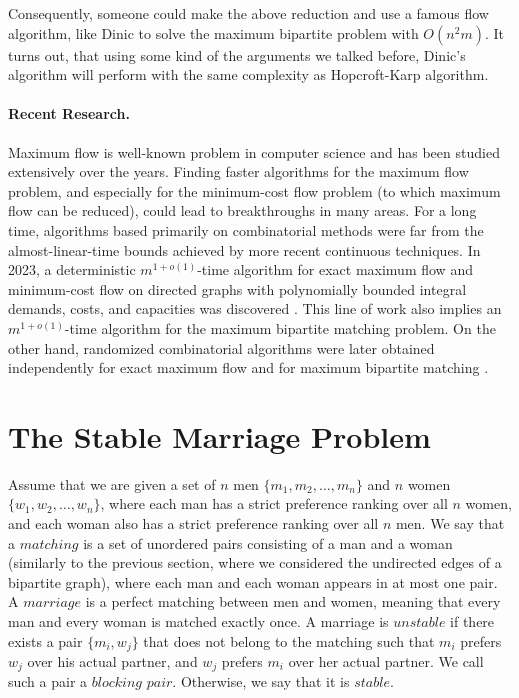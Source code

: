\documentclass[12pt]{report}
\numberwithin{algorithm}{chapter}
\begin{document}
	Consequently, someone could make the above reduction and use a famous flow algorithm, like Dinic \cite{dinitz1970} to solve the maximum bipartite problem with $O(n^{2}m)$. It turns out, that using some kind of the arguments we talked before, Dinic's algorithm will perform with the same complexity as Hopcroft-Karp algorithm.

	\paragraph{Recent Research.} Maximum flow is well-known problem in computer science and has been studied extensively over the years. Finding faster algorithms for the maximum flow problem, and  especially for the minimum-cost flow problem (to which maximum flow can be reduced), could lead to breakthroughs in many areas. For a long time, algorithms based primarily on combinatorial methods were far from the almost-linear-time bounds achieved by more recent continuous techniques. In 2023, a deterministic $m^{1+o(1)}$-time algorithm for exact maximum flow and minimum-cost flow on directed graphs with polynomially bounded integral demands, costs, and capacities was discovered \cite{brand2023deterministic}. This line of work also implies an $m^{1+o(1)}$-time algorithm for the maximum bipartite matching problem. On the other hand, randomized combinatorial algorithms were later obtained independently for exact maximum flow \cite{maxFlowBernstein} and for maximum bipartite matching \cite{MBMChuzhoy}.

	

\clearpage 
\newpage
	
\section{The Stable Marriage Problem}\label{sec:stable-marriage}

	Assume that we are given a set of $n$ men $\{m_{1}, m_{2}, \dots, m_{n}\}$ and $n$ women $\{w_{1}, w_{2}, \dots, w_{n}\}$, where each man has a strict preference ranking over all $n$ women, and each woman also has a strict preference ranking over all $n$ men. We say that a $\mathit{matching}$ is a set of unordered pairs consisting of a man and a woman (similarly to the previous section, where we considered the undirected edges of a bipartite graph), where each man and each woman appears in at most one pair. A $\mathit{marriage}$ is a perfect matching between men and women, meaning that every man and every woman is matched exactly once. A marriage is $\mathit{unstable}$ if there exists a pair $\{m_{i}, w_{j}\}$ that does not belong to the matching such that $m_{i}$ prefers $w_{j}$ over his actual partner, and $w_{j}$ prefers $m_{i}$ over her actual partner. We call such a pair a $\mathit{blocking}$ $\mathit{pair}$. Otherwise, we say that it is $\mathit{stable}$.
\end{document}
